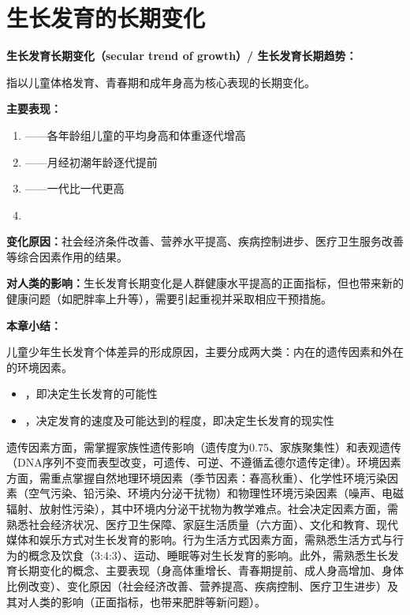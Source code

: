 \section{生长发育的长期变化}

\begin{defbox}
\textbf{生长发育长期变化（secular trend of growth）/ 生长发育长期趋势：}

指以儿童体格发育、青春期和成年身高为核心表现的长期变化。

\textbf{主要表现：}
\begin{enumerate}[leftmargin=*]
    \item {}——各年龄组儿童的平均身高和体重逐代增高
    \item {}——月经初潮年龄逐代提前
    \item {}——一代比一代更高
    \item {}
\end{enumerate}

\textbf{变化原因：}社会经济条件改善、营养水平提高、疾病控制进步、医疗卫生服务改善等综合因素作用的结果。

\textbf{对人类的影响：}生长发育长期变化是人群健康水平提高的正面指标，但也带来新的健康问题（如肥胖率上升等），需要引起重视并采取相应干预措施。
\end{defbox}

\begin{keybox}
\textbf{本章小结：}

儿童少年生长发育个体差异的形成原因，主要分成两大类：内在的遗传因素和外在的环境因素。
\begin{itemize}[leftmargin=*]
    \item {}，即决定生长发育的可能性
    \item {}，决定发育的速度及可能达到的程度，即决定生长发育的现实性
\end{itemize}

遗传因素方面，需掌握家族性遗传影响（遗传度为0.75、家族聚集性）和表观遗传（DNA序列不变而表型改变，可遗传、可逆、不遵循孟德尔遗传定律）。环境因素方面，需重点掌握自然地理环境因素（季节因素：春高秋重）、化学性环境污染因素（空气污染、铅污染、环境内分泌干扰物）和物理性环境污染因素（噪声、电磁辐射、放射性污染），其中环境内分泌干扰物为教学难点。社会决定因素方面，需熟悉社会经济状况、医疗卫生保障、家庭生活质量（六方面）、文化和教育、现代媒体和娱乐方式对生长发育的影响。行为生活方式因素方面，需熟悉生活方式与行为的概念及饮食（3:4:3）、运动、睡眠等对生长发育的影响。此外，需熟悉生长发育长期变化的概念、主要表现（身高体重增长、青春期提前、成人身高增加、身体比例改变）、变化原因（社会经济改善、营养提高、疾病控制、医疗卫生进步）及其对人类的影响（正面指标，也带来肥胖等新问题）。
\end{keybox}

